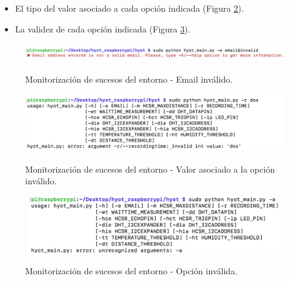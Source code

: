 \documentclass[12pt,a4paper, twoside]{report}
\begin{document}
\begin{enumerate}
\begin{itemize}
			\item El tipo del valor asociado a cada opción indicada (Figura \ref{fig:userguide_monitoring_optionType}).	
			
			\item La validez de cada opción indicada (Figura \ref{fig:userguide_monitoring_invalidOption}). 
	 	\end{itemize}	
	 \end{enumerate}
	 
	 \begin{figure}[!ht]   
		\caption{Monitorización de sucesos del entorno - Email inválido.} 
		\begin{center} 
			\includegraphics[width=13cm,height=0.8cm]{Images/userGuide/monitoring/invalidMail} \\
			\label{fig:userguide_monitoring_invalidMail} 
		\end{center}  
	\end{figure}
	 
	 \begin{figure}[!ht]   
		\caption{Monitorización de sucesos del entorno - Valor asociado a la opción inválido.} 
		\begin{center} 
			\includegraphics[width=14cm,height=2.5cm]{Images/userGuide/monitoring/valueType} \\
			\label{fig:userguide_monitoring_optionType} 
		\end{center}  
	\end{figure}
	
	\begin{figure}[!ht]   
		\caption{Monitorización de sucesos del entorno - Opción inválida.} 
		\begin{center} 
			\includegraphics[width=14cm,height=2.5cm]{Images/userGuide/monitoring/unrecognized} \\
			\label{fig:userguide_monitoring_invalidOption} 
		\end{center}  
	\end{figure}
\end{document}
